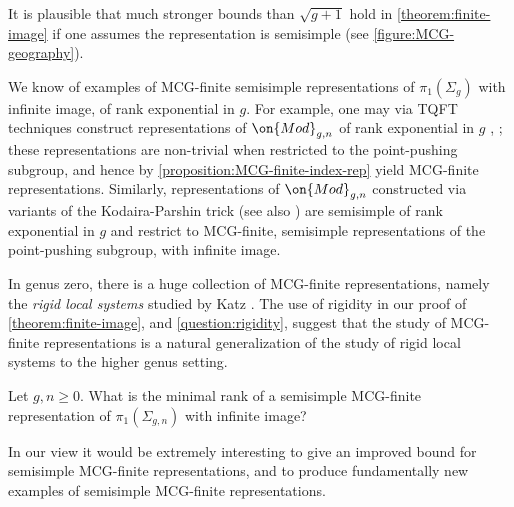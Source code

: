 	It is plausible that much stronger bounds
than $\sqrt{g+1}$ hold in \autoref{theorem:finite-image}
if one assumes the representation is semisimple (see \autoref{figure:MCG-geography}).

\begin{example}
\notready
	\label{example:semisimple-bound}
We know of examples of MCG-finite
semisimple representations of $\pi_1(\Sigma_g)$ with infinite image, of rank exponential in $g$. For example, one may via TQFT techniques construct representations of $\on{Mod}_{g,n}$
of rank exponential in $g$
\cite[Corollary 4.3]{koberda2016quotients}, \cite[Theorem 5.1]{biswas2018representations};
these representations are non-trivial when restricted to the point-pushing subgroup, and hence by \autoref{proposition:MCG-finite-index-rep} yield MCG-finite representations.
Similarly, representations of $\on{Mod}_{g,n}$ constructed via variants of
the Kodaira-Parshin trick
\cite[Example 3.3.1]{lawrence2019representations}
(see also \cite[Proposition 5.1.1 and Remark 5.1.2]{LL:geometric-local-systems})
are semisimple of rank exponential in $g$ and restrict to
MCG-finite, semisimple representations of the point-pushing subgroup, with infinite image.
\end{example}

\begin{example}
\notready
	In genus zero, there is a huge collection of MCG-finite representations, namely the \emph{rigid local systems} studied by Katz \cite{katz2016rigid}. The use of rigidity in our proof of \autoref{theorem:finite-image}, and \autoref{question:rigidity}, suggest that the study of MCG-finite representations is a natural generalization  of the study of rigid local systems to the higher genus setting.
\end{example}

\begin{question}
\notready
Let $g, n\geq 0$. What is the minimal rank of a semisimple MCG-finite representation of $\pi_1(\Sigma_{g,n})$ with infinite image?
\end{question}

In our view it would be extremely interesting to give an improved bound for semisimple MCG-finite representations, and to produce fundamentally new examples of semisimple MCG-finite representations.

